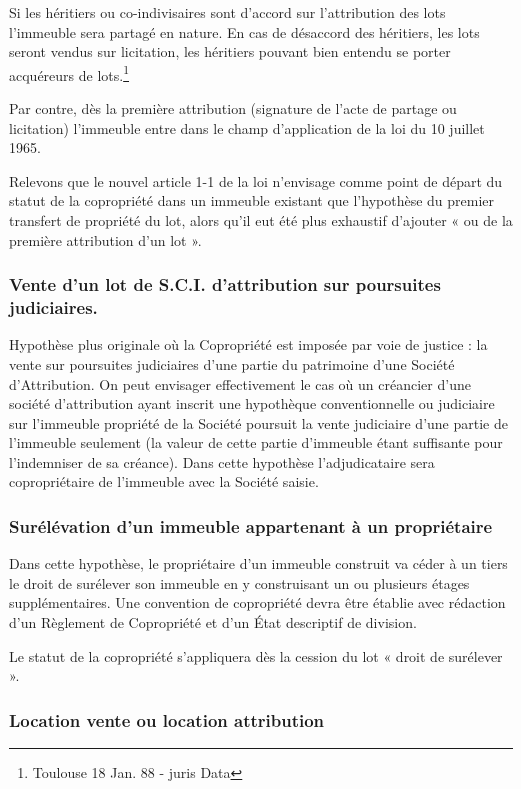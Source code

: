 			Si les héritiers ou co-indivisaires sont d'accord sur l'attribution des lots l'immeuble sera partagé en nature. En cas de désaccord des héritiers, les lots seront vendus sur licitation, les héritiers pouvant bien entendu se porter acquéreurs de lots.\footnote{Toulouse 18 Jan. 88 - juris Data }
			
			Par contre, dès la première attribution (signature de l'acte de partage ou licitation) l'immeuble entre dans le champ d'application de la loi du 10 juillet 1965.

			Relevons que le nouvel article 1\ier{}-1 de la loi n’envisage comme point de départ du statut de la copropriété dans un immeuble existant que l’hypothèse du premier transfert de propriété du lot, alors qu’il eut été plus exhaustif d’ajouter « ou de la première attribution d’un lot ».
		
		\subsubsection{Vente d’un lot de S.C.I. d’attribution sur poursuites judiciaires.}
		
			Hypothèse plus originale où la Copropriété est imposée par voie de justice : la vente sur poursuites judiciaires d'une partie du patrimoine d'une Société d'Attribution. On peut envisager effectivement le cas où un créancier d'une société d'attribution ayant inscrit une hypothèque conventionnelle ou judiciaire sur l'immeuble propriété de la Société poursuit la vente judiciaire d'une partie de l'immeuble seulement (la valeur de cette partie d'immeuble étant suffisante pour l'indemniser de sa créance). Dans cette hypothèse l'adjudicataire sera copropriétaire de l'immeuble avec la Société saisie.
		
		\subsubsection{Surélévation d'un immeuble appartenant à un propriétaire}
		
			Dans cette hypothèse, le propriétaire d'un immeuble construit va céder à un tiers le droit de surélever son immeuble en y construisant un ou plusieurs étages supplémentaires. Une convention de copropriété devra être établie avec rédaction d'un Règlement de Copropriété et d'un État descriptif de division.
			
			Le statut de la copropriété s’appliquera dès la cession du lot « droit de surélever ».
		
		\subsubsection{Location vente ou location attribution}
		
